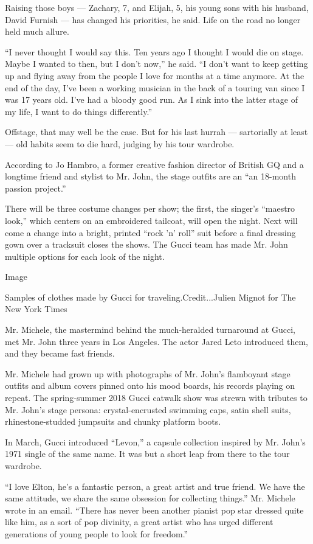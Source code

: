 Raising those boys --- Zachary, 7, and Elijah, 5, his young sons with
his husband, David Furnish --- has changed his priorities, he said. Life
on the road no longer held much allure.

``I never thought I would say this. Ten years ago I thought I would die
on stage. Maybe I wanted to then, but I don't now,'' he said. ``I don't
want to keep getting up and flying away from the people I love for
months at a time anymore. At the end of the day, I've been a working
musician in the back of a touring van since I was 17 years old. I've had
a bloody good run. As I sink into the latter stage of my life, I want to
do things differently.''

Offstage, that may well be the case. But for his last hurrah ---
sartorially at least --- old habits seem to die hard, judging by his
tour wardrobe.

According to Jo Hambro, a former creative fashion director of British GQ
and a longtime friend and stylist to Mr. John, the stage outfits are an
``an 18-month passion project.''

There will be three costume changes per show; the first, the singer's
``maestro look,'' which centers on an embroidered tailcoat, will open
the night. Next will come a change into a bright, printed ``rock 'n'
roll'' suit before a final dressing gown over a tracksuit closes the
shows. The Gucci team has made Mr. John multiple options for each look
of the night.

Image

Samples of clothes made by Gucci for traveling.Credit...Julien Mignot
for The New York Times

Mr. Michele, the mastermind behind the much-heralded turnaround at
Gucci, met Mr. John three years in Los Angeles. The actor Jared Leto
introduced them, and they became fast friends.

Mr. Michele had grown up with photographs of Mr. John's flamboyant stage
outfits and album covers pinned onto his mood boards, his records
playing on repeat. The spring-summer 2018 Gucci catwalk show was strewn
with tributes to Mr. John's stage persona: crystal-encrusted swimming
caps, satin shell suits, rhinestone-studded jumpsuits and chunky
platform boots.

In March, Gucci introduced ``Levon,'' a capsule collection inspired by
Mr. John's 1971 single of the same name. It was but a short leap from
there to the tour wardrobe.

``I love Elton, he's a fantastic person, a great artist and true friend.
We have the same attitude, we share the same obsession for collecting
things.'' Mr. Michele wrote in an email. ``There has never been another
pianist pop star dressed quite like him, as a sort of pop divinity, a
great artist who has urged different generations of young people to look
for freedom.''

